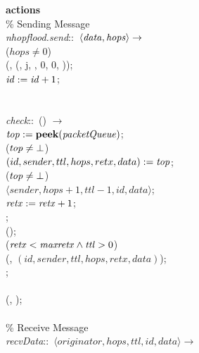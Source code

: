 \begin{figure}[H]
  \centering
  \begin{boxedminipage}{\linewidth}
    \null \textbf{actions}\\
    \null\qq \% Sending Message\\
    \null\qq \emph{nhopflood.send}::~$\langle \mbox{\emph{data}}, \mbox{\emph{hops}}\rangle\rightarrow$\\
    \null\qq\qq {} ($hops \not= 0$) \\
    \null\qq\qq\qq {}(, (, j, , 0, 0, )); \\
    \null\qq\qq\qq $\mbox{\emph{id}} \mathrel{:=} \mbox{\emph{id}} + 1$; \\
    \null\qq\qq {}\\~\\
    \null\qq \emph{check}::~() $\rightarrow$\\
    \null\qq\qq $\mbox{\emph{top}} \mathrel{:=} \mbox{\textbf{peek}}(\mbox{\emph{packetQueue}})$;\\
    \null\qq\qq {} ($\mbox{\emph{top}} \not= \bot$) \\
    \null\qq\qq\qq $(id, sender, ttl, hops, retx, data) \mathrel{:=} \mbox{\emph{top}}$;\\
    \null\qq\qq\qq {} ($\mbox{\emph{top}} \not= \bot$) \\
    \null\qq\qq\qq\qq {}$\langle sender, hops + 1, ttl - 1, id, data\rangle$;\\
    \null\qq\qq\qq\qq $\mbox{\emph{retx}} \mathrel{:=} \mbox{\emph{retx}} + 1$;\\
    \null\qq\qq\qq {};\\
    \null\qq\qq\qq {}();\\
    \null\qq\qq\qq {} ($\mbox{\emph{retx}} < \mbox{\emph{maxretx}} \land \mbox{\emph{ttl}} > 0$) \\
    \null\qq\qq\qq\qq {}(, $(id, sender, ttl, hops, retx, data)$);\\
    \null\qq\qq\qq {}; \\
    \null\qq\qq {}\\
    \null\qq\qq {}(, ); \\~\\
    \null\qq \% Receive Message\\
    \null\qq \emph{recvData}::~$\langle originator, hops, ttl, id, data\rangle \rightarrow$\\

\end{boxedminipage}
\end{figure}
